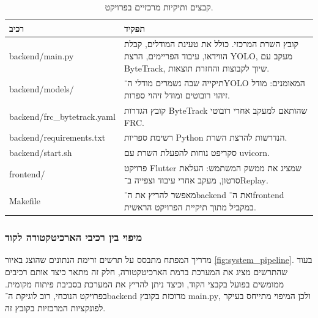 \begin{table}[H] \centering
  \begin{tabular}{|p{}|p{}|} \hline
    \textbf{רכיב} & \textbf{תפקיד} \\ \hline
    \textenglish{backend/main.py} & קובץ השרת המרכזי. כולל את טעינת
    המודלים, קבלת הווידאו, עיבוד הפריימים, הרצת \textenglish{YOLO},
    מעקב עם \textenglish{ByteTrack}, שיוך לקבוצות והחזרת תוצאות. \\
    \hline \textenglish{backend/models/} & תיקייה שבה נשמרים מודלי
    ה־\textenglish{YOLO} המאומנים: מודל זיהוי רובוטים ומודל זיהוי
    ספרות. \\ \hline
    \textenglish{backend/frc\_bytetrack.yaml} & קובץ הגדרות \textenglish{ByteTrack} שהותאם למעקב אחרי רובוטי \textenglish{FRC}. \\ \hline
    \textenglish{backend/requirements.txt} & רשימת ספריות \textenglish{Python} הנדרשות להרצת השרת. \\ \hline
    \textenglish{backend/start.sh} & סקריפט נוחות להפעלת השרת עם \textenglish{uvicorn}. \\ \hline
    \textenglish{frontend/} & פרויקט \textenglish{Flutter} שמציג את ממשק המשתמש: העלאת סרטון, מעקב אחרי עיבוד וצפייה ב־\textenglish{Replay}. \\ \hline
    \textenglish{Makefile} & מאפשר להריץ את ה־\textenglish{backend} ואת ה־\textenglish{frontend} במקביל מתוך תיקיית הפרויקט הראשית. \\ \hline
  \end{tabular}
  \caption{קבצים ותיקיות מרכזיים בפרויקט.}
\end{table}


\subsubsection{מיפוי בין רכיבי הארכיטקטורה לקוד}

מדריך המפתח מתבסס על תרשים זרימת הנתונים שהוצג באיור
\ref{fig:system_pipeline}. בעוד שהתרשים מציג את המערכת ברמת
הארכיטקטורה, חלק זה מתאר כיצד אותם רכיבים ממומשים בפועל בקבצי הקוד,
וכיצד ניתן להריץ את המערכת בסביבת פיתוח מקומית. בפרויקט הנוכחי, רוב
לוגיקת ה־\textenglish{backend} מרוכזת בקובץ \textenglish{main.py},
ולכן המיפוי מתייחס בעיקר לפונקציות המרכזיות בקובץ זה.

